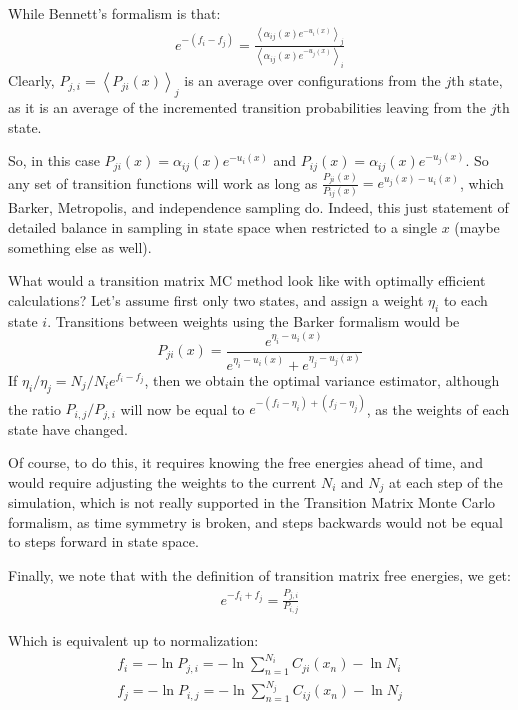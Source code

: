 \documentclass[superscriptaddress,showkeys, nofootinbib, pre, aps]{revtex4-1}
\newcommand{\expect}[1]{\left \langle #1 \right \rangle}                %
\begin{document}
While Bennett's formalism is that:
\begin{eqnarray}
e^{-(f_i-f_j)} = \frac{\expect{\alpha_{ij}(x) e^{-u_i(x)}}_j}{\expect{\alpha_{ij}(x) e^{-u_j(x)}}_i}
\end{eqnarray}
Clearly, $P_{j,i} = \expect{P_{ji}(x)}_j$ is an average over configurations from the $j$th
state, as it is an average of the incremented transition probabilities
leaving from the $j$th state.

So, in this case $P_{ji}(x) = \alpha_{ij}(x) e^{-u_i(x)}$ and $P_{ij}(x) = \alpha_{ij}(x) e^{-u_j(x)}$. So any set of transition functions will work as long as $\frac{P_{ji}(x)}{P_{ij}(x)} = e^{u_j(x)-u_i(x)}$, which Barker, Metropolis, and independence
sampling do.  Indeed, this just statement of detailed balance in sampling in state space when restricted to a single $x$ (maybe something else as well).

What would a transition matrix MC method look like with optimally efficient calculations? Let's assume first only two states, and assign a weight $\eta_i$ to each state $i$.  Transitions between weights
using the Barker formalism would be 
\begin{equation}
P_{ji}(x) = \frac{e^{\eta_i-u_i(x)}}{e^{\eta_i - u_i(x)} + e^{\eta_j - u_j(x)}}
\end{equation}
If $\eta_i/\eta_j = N_j/N_i e^{f_i-f_j}$, then we obtain the optimal
variance estimator, although the ratio $P_{i,j}/P_{j,i}$ will now be
equal to $e^{-(f_i-\eta_i) + (f_j - \eta_j)}$, as the weights of each
state have changed.

Of course, to do this, it requires knowing the free energies ahead of
time, and would require adjusting the weights to the current $N_i$ and
$N_j$ at each step of the simulation, which is not really supported in
the Transition Matrix Monte Carlo formalism, as time symmetry is
broken, and steps backwards would not be equal to steps forward in
state space.

Finally, we note that with the definition of transition matrix free energies, we get:
\begin{eqnarray}
e^{-f_i+f_j} = \frac{P_{j,i}}{P_{i,j}} 
\end{eqnarray}

Which is equivalent up to normalization:
\begin{eqnarray}
f_i = -\ln P_{j,i} = -\ln \sum_{n=1}^{N_i} C_{ji}(x_n) - \ln N_i\\ 
f_j = -\ln P_{i,j} = -\ln \sum_{n=1}^{N_j} C_{ij}(x_n) - \ln N_j
\end{eqnarray}
\end{document}
